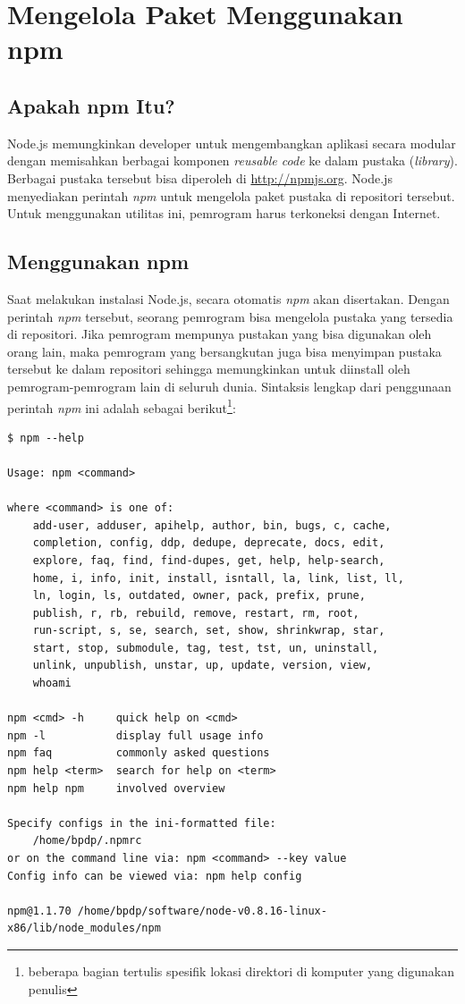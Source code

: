\chapter{Mengelola Paket Menggunakan npm}

\section{Apakah npm Itu?}

Node.js memungkinkan developer untuk mengembangkan aplikasi secara modular dengan memisahkan berbagai komponen \textit{reusable code} ke dalam pustaka (\textit{library}). Berbagai pustaka tersebut bisa diperoleh di \url{http://npmjs.org}. Node.js menyediakan perintah \textit{npm} untuk mengelola paket pustaka di repositori tersebut. Untuk menggunakan utilitas ini, pemrogram harus terkoneksi dengan Internet.

\section{Menggunakan npm}

Saat melakukan instalasi Node.js, secara otomatis \textit{npm} akan disertakan. Dengan perintah \textit{npm} tersebut, seorang pemrogram bisa mengelola pustaka yang tersedia di repositori. Jika pemrogram mempunya pustakan yang bisa digunakan oleh orang lain, maka pemrogram yang bersangkutan juga bisa menyimpan pustaka tersebut ke dalam repositori sehingga memungkinkan untuk diinstall oleh pemrogram-pemrogram lain di seluruh dunia. Sintaksis lengkap dari penggunaan perintah \textit{npm} ini adalah sebagai berikut\footnote{beberapa bagian tertulis spesifik lokasi direktori di komputer yang digunakan penulis}:

\begin{lstlisting}
$ npm --help

Usage: npm <command>

where <command> is one of:
    add-user, adduser, apihelp, author, bin, bugs, c, cache,
    completion, config, ddp, dedupe, deprecate, docs, edit,
    explore, faq, find, find-dupes, get, help, help-search,
    home, i, info, init, install, isntall, la, link, list, ll,
    ln, login, ls, outdated, owner, pack, prefix, prune,
    publish, r, rb, rebuild, remove, restart, rm, root,
    run-script, s, se, search, set, show, shrinkwrap, star,
    start, stop, submodule, tag, test, tst, un, uninstall,
    unlink, unpublish, unstar, up, update, version, view,
    whoami

npm <cmd> -h     quick help on <cmd>
npm -l           display full usage info
npm faq          commonly asked questions
npm help <term>  search for help on <term>
npm help npm     involved overview

Specify configs in the ini-formatted file:
    /home/bpdp/.npmrc
or on the command line via: npm <command> --key value
Config info can be viewed via: npm help config

npm@1.1.70 /home/bpdp/software/node-v0.8.16-linux-x86/lib/node_modules/npm
\end{lstlisting}

